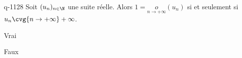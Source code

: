 \begin{truefalse}{q-1128}
Soit $(u_n)_{n\in\N}$ une suite réelle. \newline Alors  $1 = \underset{n\to+\infty}o(u_n)$ si et seulement si $u_n \cvg{n\to+\infty} +\infty$.
\item Vrai
\item* Faux
\end{truefalse}

